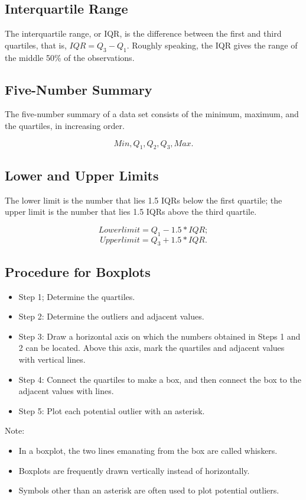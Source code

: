 \documentclass[12pt]{article}
\begin{document}
        \subsection*{Interquartile Range}
                The interquartile range, or IQR, is the difference between the first and third quartiles,
                that is, \(IQR = Q_3 - Q_1\). Roughly speaking, the IQR gives the range of the middle
                50\% of the observations.
        \subsection*{Five-Number Summary}
            The five-number summary of a data set consists of the minimum, maximum, and the quartiles,
            in increasing order.
            \begin{center}
                \[
                    Min, Q_1, Q_2, Q_3, Max.    
                \]
            \end{center}
        \subsection*{Lower and Upper Limits}
            The lower limit is the number that lies 1.5 IQRs below the first quartile; the upper limit
            is the number that lies 1.5 IQRs above the third quartile.
            \begin{center}
                \[
                    Lower limit = Q_1 - 1.5 * IQR;
                \]
                \[
                    Upper limit = Q_3 + 1.5 * IQR.  
                \]
            \end{center}
        \subsection*{Procedure for Boxplots}
            \begin{itemize}
                \item{Step 1;} Determine the quartiles.
                \item{Step 2:} Determine the outliers and adjacent values.
                \item{Step 3:} Draw a horizontal axis on which the numbers obtained in Steps 1 and 2 can
                be located. Above this axis, mark the quartiles and adjacent values with vertical lines.
                \item{Step 4:} Connect the quartiles to make a box, and then connect the box to the
                adjacent values with lines.
                \item{Step 5:} Plot each potential outlier with an asterisk.
            \end{itemize}
            Note:
            \begin{itemize}
                \item In a boxplot, the two lines emanating from the box are called whiskers.
                \item Boxplots are frequently drawn vertically instead of horizontally.
                \item Symbols other than an asterisk are often used to plot potential outliers.
            \end{itemize}
\end{document}
